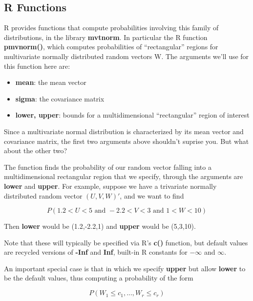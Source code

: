 \subsection{R Functions}

R provides functions that compute probabilities involving this family of
distributions, in the library {\bf mvtnorm}.  In particular  the R
function {\bf pmvnorm()}, which computes probabilities of
``rectangular'' regions for multivariate normally distributed random
vectors W.  The arguments we'll use for this function here are:

\begin{itemize}

\item {\bf mean}: the mean vector

\item {\bf sigma}: the covariance matrix

\item {\bf lower, upper}: bounds for a multidimensional ``rectangular''
region of interest

\end{itemize}

Since a multivariate normal distribution is characterized by its mean
vector and covariance matrix, the first two arguments above shouldn't
suprise you.  But what about the other two?

The function finds the probability of our random vector falling into a
multidimensional rectangular region that we specify, through the
arguments are {\bf lower} and {\bf upper}.  For example, suppose we have
a trivariate normally distributed random vector $(U,V,W)'$, and we
want to find 

\begin{equation}
P( 1.2 < U < 5 \textrm{ and } -2.2 < V < 3 \textrm{ and } 1 < W < 10)
\end{equation}

Then {\bf lower} would be (1.2,-2.2,1) and {\bf upper} would be
(5,3,10).

Note that these will typically be specified via R's {\bf c()} function,
but default values are recycled versions of {\bf -Inf} and {\bf Inf},
built-in R constants for $-\infty$ and $\infty$.

An important special case is that in which we specify {\bf upper}
but allow {\bf lower} to be the default values, thus computing a
probability of the form

\begin{equation}
P(W_1 \leq c_1,...,W_r \leq c_r)
\end{equation}

